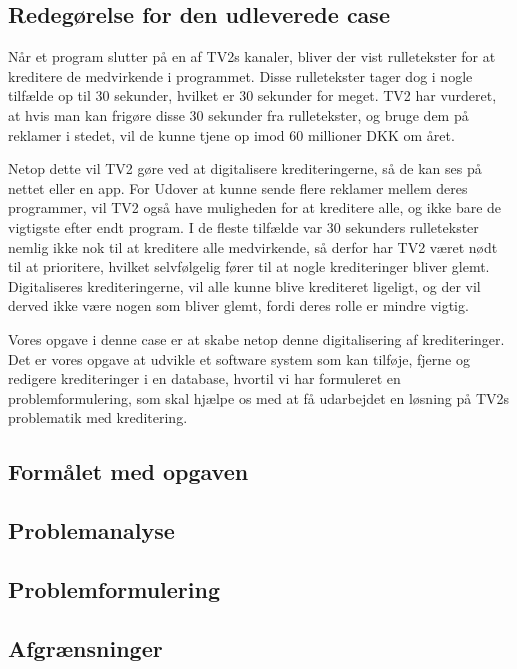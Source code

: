 \subsection{Redegørelse for den udleverede case}
Når et program slutter på en af TV2s kanaler, bliver der vist rulletekster for at kreditere de medvirkende i programmet. Disse rulletekster tager dog i nogle tilfælde op til 30 sekunder, hvilket er 30 sekunder for meget. TV2 har vurderet, at hvis man kan frigøre disse 30 sekunder fra rulletekster, og bruge dem på reklamer i stedet, vil de kunne tjene op imod 60 millioner DKK om året. \cite{url_case}

Netop dette vil TV2 gøre ved at digitalisere krediteringerne, så de kan ses på nettet eller en app. For Udover at kunne sende flere reklamer mellem deres programmer, vil TV2 også have muligheden for at kreditere alle, og ikke bare de vigtigste efter endt program. I de fleste tilfælde var 30 sekunders rulletekster nemlig ikke nok til at kreditere alle medvirkende, så derfor har TV2 været nødt til at prioritere, hvilket selvfølgelig fører til at nogle krediteringer bliver glemt. Digitaliseres krediteringerne, vil alle kunne blive krediteret ligeligt, og der vil derved ikke være nogen som bliver glemt, fordi deres rolle er mindre vigtig.

Vores opgave i denne case er at skabe netop denne digitalisering af krediteringer. Det er vores opgave at udvikle et software system som kan tilføje, fjerne og redigere krediteringer i en database, hvortil vi har formuleret en problemformulering, som skal hjælpe os med at få udarbejdet en løsning på TV2s problematik med kreditering.

\subsection{Formålet med opgaven}

\subsection{Problemanalyse}
\subsection{Problemformulering}
\subsection{Afgrænsninger}